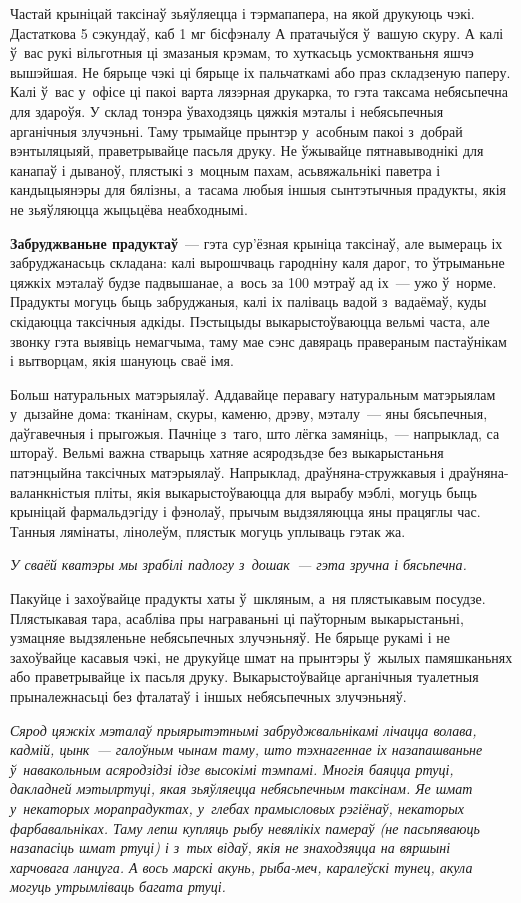 Частай крыніцай таксінаў зьяўляецца і тэрмапапера, на якой друкуюць чэкі. Дастаткова 5 сэкундаў, каб 1 мг бісфэналу А пратачыўся ў~вашую скуру. А калі ў~вас рукі вільготныя ці змазаныя крэмам, то хуткасьць усмоктваньня яшчэ вышэйшая. Не бярыце чэкі ці бярыце іх пальчаткамі або праз складзеную паперу. Калі ў~вас у~офісе ці пакоі варта лязэрная друкарка, то гэта таксама небясьпечна для здароўя. У склад тонэра ўваходзяць цяжкія мэталы і небясьпечныя арганічныя злучэньні. Таму трымайце прынтэр у~асобным пакоі з~добрай вэнтыляцыяй, праветрывайце пасьля друку. Не ўжывайце пятнавыводнікі для канапаў і дываноў, плястыкі з~моцным пахам, асьвяжальнікі паветра і кандыцыянэры для бялізны, а~тасама любыя іншыя сынтэтычныя прадукты, якія не зьяўляюцца жыцьцёва неабходнымі.

\textbf{Забруджваньне прадуктаў}~--- гэта сур'ёзная крыніца таксінаў, але вымераць іх забруджанасьць складана: калі вырошчваць гародніну каля дарог, то ўтрыманьне цяжкіх мэталаў будзе падвышанае, а~вось за 100 мэтраў ад іх~--- ужо ў~норме. Прадукты могуць быць забруджаныя, калі іх паліваць вадой з~вадаёмаў, куды скідаюцца таксічныя адкіды. Пэстыцыды выкарыстоўваюцца вельмі часта, але звонку гэта выявіць немагчыма, таму мае сэнс давяраць правераным пастаўнікам і вытворцам, якія шануюць сваё імя.

Больш натуральных матэрыялаў. Аддавайце перавагу натуральным матэрыялам у~дызайне дома: тканінам, скуры, каменю, дрэву, мэталу~--- яны бясьпечныя, даўгавечныя і прыгожыя. Пачніце з~таго, што лёгка замяніць,~--- напрыклад, са штораў. Вельмі важна стварыць хатняе асяродзьдзе без выкарыстаньня патэнцыйна таксічных матэрыялаў. Напрыклад, драўняна-стружкавыя і драўняна-валанкністыя пліты, якія выкарыстоўваюцца для вырабу мэблі, могуць быць крыніцай фармальдэгіду і фэнолаў, прычым выдзяляюцца яны працяглы час. Танныя лямінаты, лінолеўм, плястык могуць уплываць гэтак жа. 

\emph{У сваёй кватэры мы зрабілі падлогу з~дошак~--- гэта зручна і бясьпечна.}

Пакуйце і захоўвайце прадукты хаты ў~шкляным, а~ня плястыкавым посудзе. Плястыкавая тара, асабліва пры награваньні ці паўторным выкарыстаньні, узмацняе выдзяленьне небясьпечных злучэньняў. Не бярыце рукамі і не захоўвайце касавыя чэкі, не друкуйце шмат на прынтэры ў~жылых памяшканьнях або праветрывайце іх пасьля друку. Выкарыстоўвайце арганічныя туалетныя прыналежнасьці без фталатаў і іншых небясьпечных злучэньняў.

\emph{Сярод цяжкіх мэталаў прыярытэтнымі забруджвальнікамі лічацца волава, кадмій, цынк~--- галоўным чынам таму, што тэхнагеннае іх назапашваньне ў~навакольным асяродзідзі ідзе высокімі тэмпамі. Многія баяцца ртуці, дакладней мэтылртуці, якая зьяўляецца небясьпечным таксінам. Яе шмат у~некаторых морапрадуктах, у~глебах прамысловых рэгіёнаў, некаторых фарбавальніках. Таму лепш купляць рыбу невялікіх памераў (не пасьпяваюць назапасіць шмат ртуці) і з~тых відаў, якія не знаходзяцца на вяршыні харчовага ланцуга. А вось марскі акунь, рыба-меч, каралеўскі тунец, акула могуць утрымліваць багата ртуці.}

